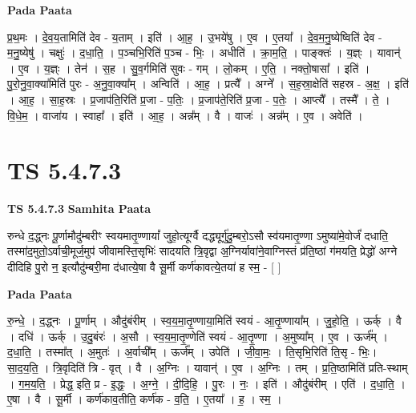\documentclass[17pt]{extarticle}
\begin{document}
\textbf{Pada Paata} \newline

प्र॒थ॒मः । दे॒व॒य॒तामिति॑ देव - य॒ताम् । इति॑ । आ॒ह॒ । उ॒भये॑षु । ए॒व । ए॒तया᳚ । दे॒व॒म॒नु॒ष्येष्विति॑ देव - म॒नु॒ष्येषु॑ । चक्षुः॑ । द॒धा॒ति॒ । प॒ञ्चभि॒रिति॑ प॒ञ्च - भिः॒ । अधीति॑ । क्रा॒म॒ति॒ । पाङ्क्तः॑ । य॒ज्ञ्ः । यावान्॑ । ए॒व । य॒ज्ञ्ः । तेन॑ । स॒ह । सु॒व॒र्गमिति॑ सुवः - गम् । लो॒कम् । ए॒ति॒ । नक्तो॒षासा᳚ । इति॑ । पु॒रो॒नु॒वा॒क्या॑मिति॑ पुरः - अ॒नु॒वा॒क्या᳚म् । अन्विति॑ । आ॒ह॒ । प्रत्यै᳚ । अग्ने᳚ । स॒ह॒स्रा॒क्षेति॑ सहस्र - अ॒क्ष॒ । इति॑ । आ॒ह॒ । सा॒ह॒स्रः । प्र॒जाप॑ति॒रिति॑ प्र॒जा - प॒तिः॒ । प्र॒जाप॑ते॒रिति॑ प्र॒जा - प॒तेः॒ । आप्त्यै᳚ । तस्मै᳚ । ते॒ । वि॒धे॒म॒ । वाजा॑य । स्वाहा᳚ । इति॑ । आ॒ह॒ । अन्न᳚म् । वै । वाजः॑ । अन्न᳚म् । ए॒व । अवेति॑ ।  \newline




\section*{ TS 5.4.7.3 }

\textbf{TS 5.4.7.3 } \newline
\textbf{Samhita Paata} \newline

रुन्धे द॒द्ध्नः पू॒र्णामौदु॑म्बरीꣳ स्वयमातृ॒ण्णायां᳚ जुहो॒त्यूर्ग्वै दद्ध्यूर्गु॑दु॒म्बरो॒ऽसौ स्व॑यमातृ॒ण्णा ऽमुष्या॑मे॒वोर्जं॑ दधाति॒ तस्मा॑द॒मुतो॒ऽर्वाची॒मूर्ज॒मुप॑ जीवामस्ति॒सृभिः॑ सादयति त्रि॒वृद्वा अ॒ग्निर्यावा॑ने॒वाग्निस्तं प्र॑ति॒ष्ठां ग॑मयति॒ प्रेद्धो॑ अग्ने दीदिहि पु॒रो न॒ इत्यौदु॑म्बरी॒मा द॑धात्ये॒षा वै सू॒र्मी कर्ण॑कावत्ये॒तया॑ ह स्म॒ - [  ] \newline

\textbf{Pada Paata} \newline

रु॒न्धे॒ । द॒द्ध्नः । पू॒र्णाम् । औदु॑बंरीम् । स्व॒य॒मा॒तृ॒ण्णाया॒मिति॑ स्वयं - आ॒तृ॒ण्णाया᳚म् । जु॒हो॒ति॒ । ऊर्क् । वै । दधि॑ । ऊर्क् । उ॒दु॒बंरः॑ । अ॒सौ । स्व॒य॒मा॒तृ॒ण्णेति॑ स्वयं - आ॒तृ॒ण्णा । अ॒मुष्या᳚म् । ए॒व । ऊर्ज᳚म् । द॒धा॒ति॒ । तस्मा᳚त् । अ॒मुतः॑ । अ॒र्वाची᳚म् । ऊर्ज᳚म् । उपेति॑ । जी॒वा॒मः॒ । ति॒सृभि॒रिति॑ ति॒सृ - भिः॒। सा॒द॒य॒ति॒ । त्रि॒वृदिति॑ त्रि - वृत् । वै । अ॒ग्निः । यावान्॑ । ए॒व । अ॒ग्निः । तम् । प्र॒ति॒ष्ठामिति॑ प्रति-स्थाम् । ग॒म॒य॒ति॒ । प्रेद्ध॒ इति॒ प्र - इ॒द्धः॒ । अ॒ग्ने॒ । दी॒दि॒हि॒ । पु॒रः । नः॒ । इति॑ । औदु॑बंरीम् । एति॑ । द॒धा॒ति॒ । ए॒षा । वै । सू॒र्मी । कर्ण॑काव॒तीति॒ कर्ण॑क - व॒ति॒ । ए॒तया᳚ । ह॒ । स्म॒ ।  \newline
\end{document}
